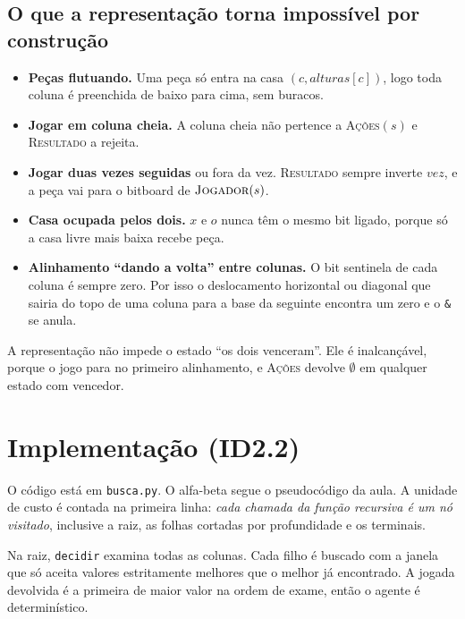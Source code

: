 \documentclass[11pt,a4paper]{article}
\newcommand{\fn}[1]{\textsc{#1}}            %
\newcommand{\arq}[1]{\texttt{#1}}
\begin{document}
\subsection{O que a representação torna impossível por construção}
\begin{itemize}
  \item \textbf{Peças flutuando.} Uma peça só entra na casa $(c, \mathit{alturas}[c])$, logo toda coluna é
        preenchida de baixo para cima, sem buracos.
  \item \textbf{Jogar em coluna cheia.} A coluna cheia não pertence a \fn{Ações}$(s)$ e \fn{Resultado} a rejeita.
  \item \textbf{Jogar duas vezes seguidas} ou fora da vez. \fn{Resultado} sempre inverte $\mathit{vez}$, e a
        peça vai para o bitboard de $\fn{Jogador}(s)$.
  \item \textbf{Casa ocupada pelos dois.} $x$ e $o$ nunca têm o mesmo bit ligado, porque só a casa livre mais baixa recebe peça.
  \item \textbf{Alinhamento ``dando a volta'' entre colunas.} O bit sentinela de cada coluna é sempre zero.
        Por isso o deslocamento horizontal ou diagonal que sairia do topo de uma coluna para a base da seguinte
        encontra um zero e o \texttt{\&} se anula.
\end{itemize}
A representação não impede o estado ``os dois venceram''. Ele é inalcançável, porque o jogo para no primeiro
alinhamento, e \fn{Ações} devolve $\emptyset$ em qualquer estado com vencedor.

\section{Implementação (ID2.2)}
\label{sec:impl}

O código está em \arq{busca.py}. O alfa-beta segue o pseudocódigo da aula. A unidade de custo é contada na
primeira linha: \emph{cada chamada da função recursiva é um nó visitado}, inclusive a raiz, as folhas
cortadas por profundidade e os terminais.



Na raiz, \texttt{decidir} examina todas as colunas. Cada filho é buscado com a janela que só aceita valores
estritamente melhores que o melhor já encontrado. A jogada devolvida é a primeira de maior valor na ordem de
exame, então o agente é determinístico.
\end{document}
